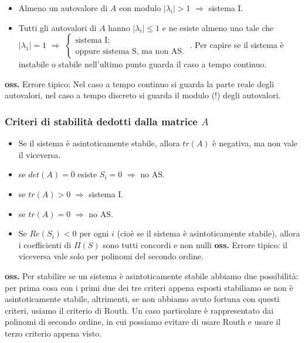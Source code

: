 \begin{landscape}
\begin{itemize}
        \item Almeno un autovalore di $A$ con modulo $|\lambda_i| > 1$ $\Longrightarrow$ sistema I.
        \item Tutti gli autovalori di $A$ hanno $|\lambda_i| \leq 1$ e ne esiste almeno uno tale che $|\lambda_1| = 1$ $\Longrightarrow$ $\begin{cases}
            \text{sistema I;}\;\\
            \text{oppure sistema S, ma non AS.}\;
        \end{cases}$. \newline
        Per capire se il sistema è instabile o stabile nell'ultimo punto guarda il caso a tempo continuo.
    \end{itemize}
    \textbf{oss.} Errore tipico: Nel caso a tempo continuo si guarda la parte reale degli autovalori, nel caso a tempo discreto si guarda il modulo (!) degli autovalori.
    \subsubsection*{Criteri di stabilità dedotti dalla matrice $A$}
    \begin{itemize}
        \item Se il sistema è asintoticamente stabile, allora $tr(A)$ è negativa, ma non vale il viceversa.
        \item se $det(A) = 0$ esiste $S_i = 0$ $\Longrightarrow$ no AS.
        \item se $tr(A) >0$ $\Longrightarrow$ sistema I.
        \item se $tr(A) = 0$ $\Longrightarrow$ no AS.
        \item Se $Re(S_i)<0$ per ogni $i$ (cioè se il sistema è asintoticamente stabile), allora i coefficienti di $\Pi(S)$ sono tutti concordi e non nulli \newline
        \textbf{oss.} Errore tipico: il viceversa vale solo per polinomi del secondo ordine.
    \end{itemize}
    \textbf{oss.} Per stabilire se un sistema è asintoticamente stabile abbiamo due possibilità: per prima cosa con i primi due dei tre criteri appena esposti stabiliamo se non è asintoticamente stabile, altrimenti, se non abbiamo avuto fortuna con questi criteri, usiamo il criterio di Routh. Un caso particolare è rappresentato dai polinomi di secondo ordine, in cui possiamo evitare di usare Routh e usare il terzo criterio appena visto.

\end{landscape}
